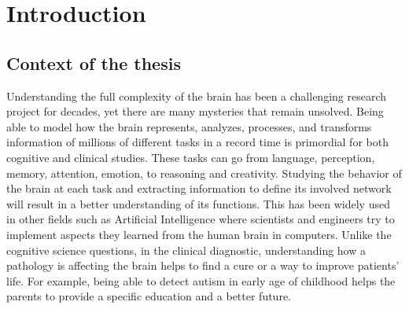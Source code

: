 



\chapter{Introduction}
\label{chapter:intro}
\noindent\makebox[\linewidth]{\rule{0.75\paperwidth}{0.4pt}}
\noindent\makebox[\linewidth]{\rule{0.75\paperwidth}{0.4pt}}

\localtableofcontents %

\noindent\makebox[\linewidth]{\rule{0.75\paperwidth}{0.4pt}}
\noindent\makebox[\linewidth]{\rule{0.75\paperwidth}{0.4pt}}

\newpage

\section{Context of the thesis}

Understanding the full complexity of the brain has been a challenging research project for decades, yet there are many mysteries that remain unsolved.
Being able to model how the brain represents, analyzes, processes, and transforms information of millions of different tasks in a record time is primordial for both cognitive and clinical studies. These tasks can go from language, perception, memory, attention, emotion, to reasoning and creativity. Studying the behavior of the brain at each task and extracting information to define its involved network will result in a better understanding of its functions. This has been widely used in other fields such as Artificial Intelligence where scientists and engineers try to implement aspects they learned from the human brain in computers. Unlike the cognitive science questions, in the clinical diagnostic, understanding how a pathology is affecting the brain helps to find a cure or a way to improve patients' life. For example, being able to detect autism in early age of childhood helps the parents to provide a specific education and a better future.\\

